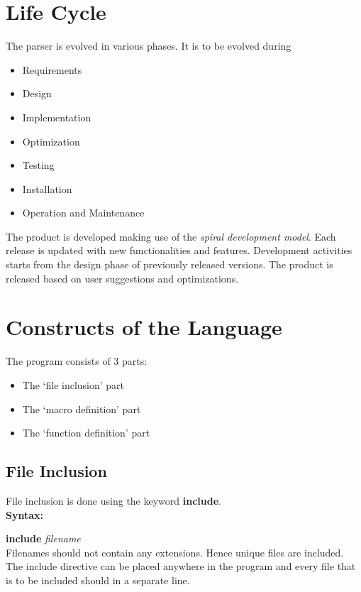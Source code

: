 \documentclass[12pt, oneside, a4paper]{article}
\begin{document}
\section{Life Cycle}
The parser is evolved in various phases.  It is to be evolved during
\begin{itemize}
\item Requirements
\item Design
\item Implementation
\item Optimization
\item Testing
\item Installation
\item Operation and Maintenance
\end{itemize}
The product is developed making use of the \emph{spiral development model}.  Each release is updated with new functionalities and features. Development activities starts from the design phase of previously released versions.  The product is released based on user suggestions and optimizations.

\section{Constructs of the Language}
The program consists of 3 parts:
\begin{itemize}
\item The `file inclusion' part
\item The `macro definition' part
\item The `function definition' part
\end{itemize}

\subsection{File Inclusion}
File inclusion is done using the keyword \textbf{include}.\\

\hspace{.5in} \textbf{Syntax:}
	
\hspace{1in}  \textbf{include} \emph{filename}\\


Filenames should not contain any extensions.  Hence unique files are included.
The include directive can be placed anywhere in the program and every file that is to be included should in a separate line.\\
\end{document}
